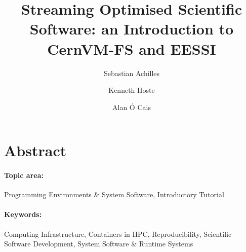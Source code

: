 \documentclass[a4paper,11pt]{article}
\begin{document}

\title{
    \textbf{\LARGE Streaming Optimised Scientific Software: an Introduction to CernVM-FS and EESSI}\\
}

\date{}

\author[1]{Sebastian Achilles}
\author[2]{Kenneth Hoste}
\author[3]{Alan \'O Cais}


\renewcommand\Authands{ and }

\maketitle


\section*{Abstract}


\paragraph{Topic area:} Programming Environments \& System Software, Introductory Tutorial

\paragraph{Keywords:} Computing Infrastructure, Containers in HPC, Reproducibility, Scientific Software Development, System Software \& Runtime Systems



\newpage
 
\end{document}
